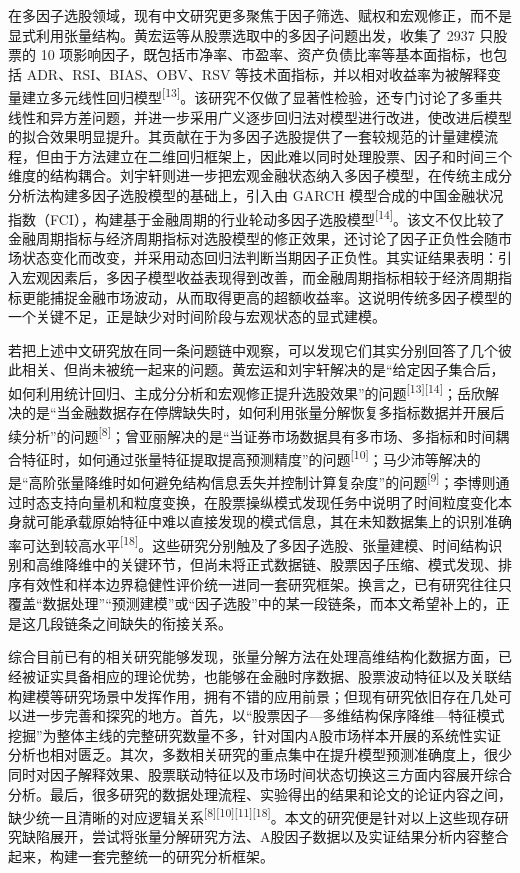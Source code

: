 在多因子选股领域，现有中文研究更多聚焦于因子筛选、赋权和宏观修正，而不是显式利用张量结构。黄宏运等从股票选取中的多因子问题出发，收集了 2937 只股票的 10 项影响因子，既包括市净率、市盈率、资产负债比率等基本面指标，也包括 ADR、RSI、BIAS、OBV、RSV 等技术面指标，并以相对收益率为被解释变量建立多元线性回归模型\textsuperscript{[13]}。该研究不仅做了显著性检验，还专门讨论了多重共线性和异方差问题，并进一步采用广义逐步回归法对模型进行改进，使改进后模型的拟合效果明显提升。其贡献在于为多因子选股提供了一套较规范的计量建模流程，但由于方法建立在二维回归框架上，因此难以同时处理股票、因子和时间三个维度的结构耦合。刘宇轩则进一步把宏观金融状态纳入多因子模型，在传统主成分分析法构建多因子选股模型的基础上，引入由 GARCH 模型合成的中国金融状况指数（FCI），构建基于金融周期的行业轮动多因子选股模型\textsuperscript{[14]}。该文不仅比较了金融周期指标与经济周期指标对选股模型的修正效果，还讨论了因子正负性会随市场状态变化而改变，并采用动态回归法判断当期因子正负性。其实证结果表明：引入宏观因素后，多因子模型收益表现得到改善，而金融周期指标相较于经济周期指标更能捕捉金融市场波动，从而取得更高的超额收益率。这说明传统多因子模型的一个关键不足，正是缺少对时间阶段与宏观状态的显式建模。

若把上述中文研究放在同一条问题链中观察，可以发现它们其实分别回答了几个彼此相关、但尚未被统一起来的问题。黄宏运和刘宇轩解决的是“给定因子集合后，如何利用统计回归、主成分分析和宏观修正提升选股效果”的问题\textsuperscript{[13][14]}；岳欣解决的是“当金融数据存在停牌缺失时，如何利用张量分解恢复多指标数据并开展后续分析”的问题\textsuperscript{[8]}；曾亚丽解决的是“当证券市场数据具有多市场、多指标和时间耦合特征时，如何通过张量特征提取提高预测精度”的问题\textsuperscript{[10]}；马少沛等解决的是“高阶张量降维时如何避免结构信息丢失并控制计算复杂度”的问题\textsuperscript{[9]}；李博则通过时态支持向量机和粒度变换，在股票操纵模式发现任务中说明了时间粒度变化本身就可能承载原始特征中难以直接发现的模式信息，其在未知数据集上的识别准确率可达到较高水平\textsuperscript{[18]}。这些研究分别触及了多因子选股、张量建模、时间结构识别和高维降维中的关键环节，但尚未将正式数据链、股票因子压缩、模式发现、排序有效性和样本边界稳健性评价统一进同一套研究框架。换言之，已有研究往往只覆盖“数据处理”“预测建模”或“因子选股”中的某一段链条，而本文希望补上的，正是这几段链条之间缺失的衔接关系。

综合目前已有的相关研究能够发现，张量分解方法在处理高维结构化数据方面，已经被证实具备相应的理论优势，也能够在金融时序数据、股票波动特征以及关联结构建模等研究场景中发挥作用，拥有不错的应用前景；但现有研究依旧存在几处可以进一步完善和探究的地方。首先，以“股票因子—多维结构保序降维—特征模式挖掘”为整体主线的完整研究数量不多，针对国内A股市场样本开展的系统性实证分析也相对匮乏。其次，多数相关研究的重点集中在提升模型预测准确度上，很少同时对因子解释效果、股票联动特征以及市场时间状态切换这三方面内容展开综合分析。最后，很多研究的数据处理流程、实验得出的结果和论文的论证内容之间，缺少统一且清晰的对应逻辑关系\textsuperscript{[8][10][11][18]}。本文的研究便是针对以上这些现存研究缺陷展开，尝试将张量分解研究方法、A股因子数据以及实证结果分析内容整合起来，构建一套完整统一的研究分析框架。

